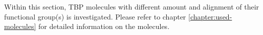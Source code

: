 Within this section, TBP molecules with different amount and alignment of their functional group(s) is investigated. Please refer to chapter \ref{chapter:used-molecules} for detailed information on the molecules.

